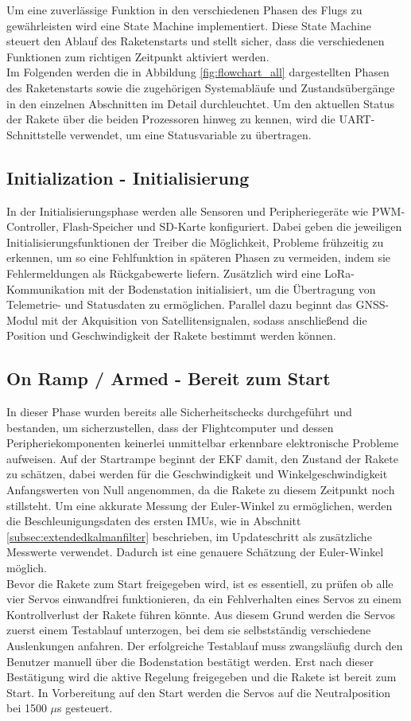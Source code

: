 Um eine zuverlässige Funktion in den verschiedenen Phasen des Flugs zu gewährleisten wird eine State Machine implementiert. Diese State Machine steuert den Ablauf des Raketenstarts und stellt sicher, dass die verschiedenen Funktionen zum richtigen Zeitpunkt aktiviert werden. 
\\
Im Folgenden werden die in Abbildung \ref{fig:flowchart_all} dargestellten Phasen des Raketenstarts sowie die zugehörigen Systemabläufe und Zustandsübergänge in den einzelnen Abschnitten im Detail durchleuchtet.
Um den aktuellen Status der Rakete über die beiden Prozessoren hinweg zu kennen, wird die UART-Schnittstelle verwendet, um eine Statusvariable zu übertragen. 

\subsection{Initialization - Initialisierung}
\label{subsec:initialization}
In der Initialisierungsphase werden alle Sensoren und Peripheriegeräte wie PWM-Controller, Flash-Speicher und SD-Karte konfiguriert. Dabei geben die jeweiligen Initialisierungsfunktionen der Treiber die Möglichkeit, Probleme frühzeitig zu erkennen, um so eine Fehlfunktion in späteren Phasen zu vermeiden, indem sie Fehlermeldungen als Rückgabewerte liefern. 
Zusätzlich wird eine LoRa-Kommunikation mit der Bodenstation initialisiert, um die Übertragung von Telemetrie- und Statusdaten zu ermöglichen. Parallel dazu beginnt das GNSS-Modul mit der Akquisition von Satellitensignalen, sodass anschließend die Position und Geschwindigkeit der Rakete bestimmt werden können.

\subsection{On Ramp / Armed - Bereit zum Start}
\label{subsec:on_ramp}
In dieser Phase wurden bereits alle Sicherheitschecks durchgeführt und bestanden, um sicherzustellen, dass der Flightcomputer und dessen Peripheriekomponenten keinerlei unmittelbar erkennbare elektronische Probleme aufweisen. Auf der Startrampe beginnt der EKF damit, den Zustand der Rakete zu schätzen, dabei werden für die Geschwindigkeit und Winkelgeschwindigkeit Anfangswerten von Null angenommen, da die Rakete zu diesem Zeitpunkt noch stillsteht. Um eine akkurate Messung der Euler-Winkel zu ermöglichen, werden die Beschleunigungsdaten des ersten IMUs, wie in Abschnitt \ref{subsec:extendedkalmanfilter} beschrieben, im Updateschritt als zusätzliche Messwerte verwendet. Dadurch ist eine genauere Schätzung der Euler-Winkel möglich. 
\\
Bevor die Rakete zum Start freigegeben wird, ist es essentiell, zu prüfen ob alle vier Servos einwandfrei funktionieren, da ein Fehlverhalten eines Servos zu einem Kontrollverlust der Rakete führen könnte. Aus diesem Grund werden die Servos zuerst einem Testablauf unterzogen, bei dem sie selbstständig verschiedene Auslenkungen anfahren. Der erfolgreiche Testablauf muss zwangsläufig durch den Benutzer manuell über die Bodenstation bestätigt werden. Erst nach dieser Bestätigung wird die aktive Regelung freigegeben und die Rakete ist bereit zum Start. In Vorbereitung auf den Start werden die Servos auf die Neutralposition bei 1500 $\mu$s gesteuert.

